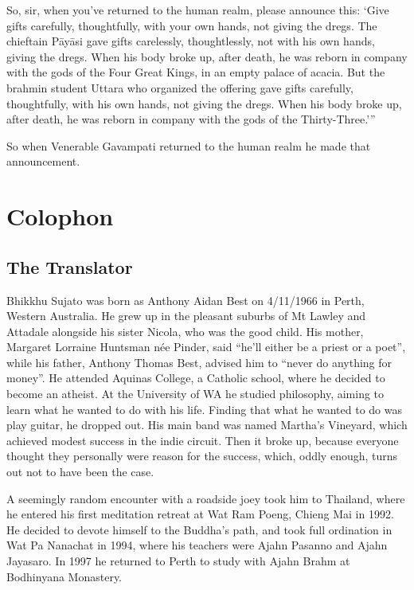 \documentclass[12pt,openany]{book}%
\let\oldbackmatter\backmatter
\renewcommand{\backmatter}{%
\chapterfont{\setstretch{.85}\normalfont\centering}%
\sectionfont{\setstretch{.85}\Semiboldsubheadfont}%
\oldbackmatter}
\begin{document}
So, sir, when you’ve returned to the human realm, please announce this: ‘Give gifts carefully, thoughtfully, with your own hands, not giving the dregs. The chieftain \textsanskrit{Pāyāsi} gave gifts carelessly, thoughtlessly, not with his own hands, giving the dregs. When his body broke up, after death, he was reborn in company with the gods of the Four Great Kings, in an empty palace of acacia. But the brahmin student Uttara who organized the offering gave gifts carefully, thoughtfully, with his own hands, not giving the dregs. When his body broke up, after death, he was reborn in company with the gods of the Thirty-Three.’” 

So when Venerable Gavampati returned to the human realm he made that announcement. 

%
\backmatter%
\chapter*{Colophon}

\section*{The Translator}

Bhikkhu Sujato was born as Anthony Aidan Best on 4/11/1966 in Perth, Western Australia. He grew up in the pleasant suburbs of Mt Lawley and Attadale alongside his sister Nicola, who was the good child. His mother, Margaret Lorraine Huntsman née Pinder, said “he’ll either be a priest or a poet”, while his father, Anthony Thomas Best, advised him to “never do anything for money”. He attended Aquinas College, a Catholic school, where he decided to become an atheist. At the University of WA he studied philosophy, aiming to learn what he wanted to do with his life. Finding that what he wanted to do was play guitar, he dropped out. His main band was named Martha’s Vineyard, which achieved modest success in the indie circuit. Then it broke up, because everyone thought they personally were reason for the success, which, oddly enough, turns out not to have been the case. 

A seemingly random encounter with a roadside joey took him to Thailand, where he entered his first meditation retreat at Wat Ram Poeng, Chieng Mai in 1992. He decided to devote himself to the Buddha’s path, and took full ordination in Wat Pa Nanachat in 1994, where his teachers were Ajahn Pasanno and Ajahn Jayasaro. In 1997 he returned to Perth to study with Ajahn Brahm at Bodhinyana Monastery. 
\end{document}
